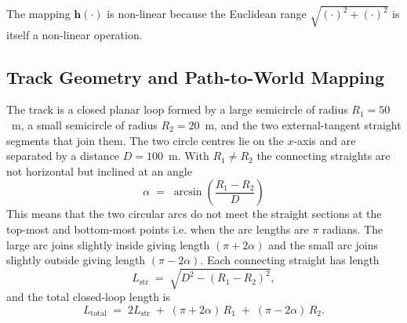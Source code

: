 \documentclass{article}
\begin{document}
The mapping $\mathbf{h}(\cdot)$ is non-linear because the Euclidean range $\sqrt{(\cdot)^{2} + (\cdot)^{2}}$ is itself a non-linear operation.

\subsection{Track Geometry and Path-to-World Mapping}
\label{subsec:track}

The track is a closed planar loop formed by a large semicircle of radius $R_1=50$~m, a small semicircle of radius $R_2=20$~m, and the two external-tangent straight segments that join them. The two circle centres lie on the $x$-axis and are separated by a distance $D=100$~m. With $R_1\neq R_2$ the connecting straights are not horizontal but inclined at an angle
\begin{equation}
    \alpha \;=\; \arcsin\!\left(\frac{R_1 - R_2}{D}\right)
    \label{eq:alpha}
\end{equation}
This means that the two circular arcs do not meet the straight sections at the top-most and bottom-most points i.e. when the arc lengths are $\pi$ radians. The large arc joins slightly inside giving length $(\pi+2\alpha)$ and the small arc joins slightly outside giving length $(\pi-2\alpha)$. Each connecting straight has length
\begin{equation}
    L_{\text{str}} \;=\; \sqrt{D^{2} - (R_1 - R_2)^{2}},
\end{equation}
and the total closed-loop length is
\begin{equation}
    L_{\text{total}} \;=\; 2 L_{\text{str}} \;+\; (\pi + 2\alpha)\,R_1 \;+\; (\pi - 2\alpha)\,R_2.
\end{equation}
\end{document}
